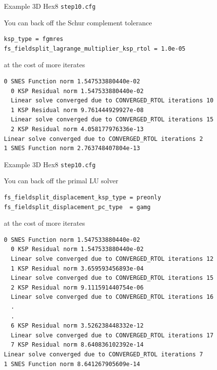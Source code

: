 \documentclass[dvipsnames]{beamer}
\begin{document}
%
\begin{frame}[fragile]{Example 3D Hex8 \texttt{step10.cfg}}

\begin{block}{You can back off the Schur complement tolerance}
\begin{verbatim}
ksp_type = fgmres
fs_fieldsplit_lagrange_multiplier_ksp_rtol = 1.0e-05
\end{verbatim}
at the cost of more iterates
{\scriptsize
\begin{verbatim}
0 SNES Function norm 1.547533880440e-02 
  0 KSP Residual norm 1.547533880440e-02 
  Linear solve converged due to CONVERGED_RTOL iterations 10
  1 KSP Residual norm 9.761444929927e-08 
  Linear solve converged due to CONVERGED_RTOL iterations 15
  2 KSP Residual norm 4.058177976336e-13 
Linear solve converged due to CONVERGED_RTOL iterations 2
1 SNES Function norm 2.763748407804e-13 
\end{verbatim}
}
\end{block}
\end{frame}
%
\begin{frame}[fragile]{Example 3D Hex8 \texttt{step10.cfg}}

\begin{block}{You can back off the primal LU solver}
\begin{verbatim}
fs_fieldsplit_displacement_ksp_type = preonly
fs_fieldsplit_displacement_pc_type  = gamg
\end{verbatim}
at the cost of more iterates
{\scriptsize
\begin{verbatim}
0 SNES Function norm 1.547533880440e-02 
  0 KSP Residual norm 1.547533880440e-02 
  Linear solve converged due to CONVERGED_RTOL iterations 12
  1 KSP Residual norm 3.659593456893e-04 
  Linear solve converged due to CONVERGED_RTOL iterations 15
  2 KSP Residual norm 9.111591440754e-06 
  Linear solve converged due to CONVERGED_RTOL iterations 16
  .
  .
  6 KSP Residual norm 3.526238448332e-12 
  Linear solve converged due to CONVERGED_RTOL iterations 17
  7 KSP Residual norm 8.640836102392e-14 
Linear solve converged due to CONVERGED_RTOL iterations 7
1 SNES Function norm 8.641267905609e-14 
\end{verbatim}
}
\end{block}
\end{frame}
%
\end{document}
